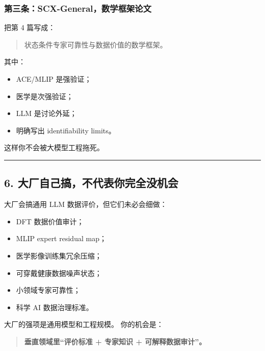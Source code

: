 \documentclass[
  12pt,
]{ctexart}
\providecommand{\tightlist}{%
  \setlength{\itemsep}{0pt}\setlength{\parskip}{0pt}}
\begin{document}
\subsubsection{第三条：SCX-General，数学框架论文}\label{ux7b2cux4e09ux6761scx-generalux6570ux5b66ux6846ux67b6ux8bbaux6587}

把第 4 篇写成：

\begin{quote}
状态条件专家可靠性与数据价值的数学框架。
\end{quote}

其中：

\begin{itemize}
\tightlist
\item
  ACE/MLIP 是强验证；
\item
  医学是次强验证；
\item
  LLM 是讨论外延；
\item
  明确写出 identifiability limits。
\end{itemize}

这样你不会被大模型工程拖死。

\begin{center}\rule{0.5\linewidth}{0.5pt}\end{center}

\subsection{6.
大厂自己搞，不代表你完全没机会}\label{ux5927ux5382ux81eaux5df1ux641eux4e0dux4ee3ux8868ux4f60ux5b8cux5168ux6ca1ux673aux4f1a}

大厂会搞通用 LLM 数据评价，但它们未必会细做：

\begin{itemize}
\tightlist
\item
  DFT 数据价值审计；
\item
  MLIP expert residual map；
\item
  医学影像训练集冗余压缩；
\item
  可穿戴健康数据噪声状态；
\item
  小领域专家可靠性；
\item
  科学 AI 数据治理标准。
\end{itemize}

大厂的强项是通用模型和工程规模。 你的机会是：

\begin{quote}
\textbf{垂直领域里``评价标准 + 专家知识 + 可解释数据审计''。}
\end{quote}
\end{document}
